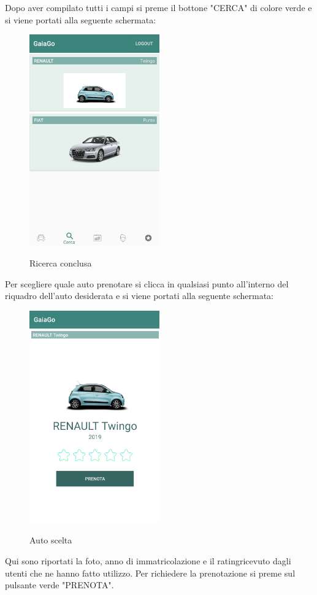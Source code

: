 Dopo aver compilato tutti i campi si preme il bottone "CERCA" di colore verde e si viene portati alla seguente schermata:
  \begin{figure}[H] 
	\centering 
	\includegraphics[width=0.5\textwidth]{res/images/ricerca_conclusa.png}\\
	\caption{Ricerca conclusa}
	\label{conclusa}
\end{figure}
\pagebreak

Per scegliere quale auto prenotare si clicca in qualsiasi punto all'interno del riquadro dell'auto desiderata e si viene portati alla seguente schermata:
  \begin{figure}[H] 
	\centering 
	\includegraphics[width=0.5\textwidth]{res/images/prenotazione1.png}\\
	\caption{Auto scelta}
	\label{scelta}
\end{figure}
Qui sono riportati la foto, anno di immatricolazione e il rating\glosp ricevuto dagli utenti che ne hanno fatto utilizzo. Per richiedere la prenotazione si preme sul pulsante verde "PRENOTA".
\pagebreak

